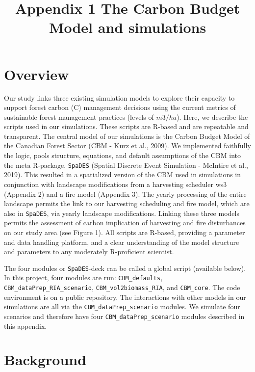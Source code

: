 \documentclass[
]{article}
\title{Appendix 1 The Carbon Budget Model and simulations}
\author{}
\date{\vspace{-2.5em}}
\begin{document}
\maketitle

\hypertarget{overview}{%
\section{Overview}\label{overview}}

Our study links three existing simulation models to explore their
capacity to support forest carbon (C) management decisions using the
current metrics of sustainable forest management practices (levels of
\(m3/ha\)). Here, we describe the scripts used in our simulations. These
scripts are R-based and are repeatable and transparent. The central
model of our simulations is the Carbon Budget Model of the Canadian
Forest Sector (CBM - Kurz et al., 2009). We implemented faithfully the
logic, pools structure, equations, and default assumptions of the CBM
into the meta R-package, \texttt{SpaDES} (Spatial Discrete Event
Simulation - McIntire et al., 2019). This resulted in a spatialized
version of the CBM used in simulations in conjunction with landscape
modifications from a harvesting scheduler ws3 (Appendix 2) and a fire
model (Appendix 3). The yearly processing of the entire landscape
permits the link to our harvesting scheduling and fire model, which are
also in \texttt{SpaDES}, via yearly landscape modifications. Linking
these three models permits the assessment of carbon implication of
harvesting and fire disturbances on our study area (see Figure 1). All
scripts are R-based, providing a parameter and data handling platform,
and a clear understanding of the model structure and parameters to any
moderately R-proficient scientist.

The four modules or \texttt{SpaDES}-deck can be called a global script
(available below). In this project, four modules are run:
\texttt{CBM\_defaults}, \texttt{CBM\_dataPrep\_RIA\_scenario},
\texttt{CBM\_vol2biomass\_RIA}, and \texttt{CBM\_core}. The code
environment is on a public repository. The interactions with other
models in our simulations are all via the
\texttt{CBM\_dataPrep\_scenario} modules. We simulate four scenarios and
therefore have four \texttt{CBM\_dataPrep\_scenario} modules described
in this appendix.

\hypertarget{background}{%
\section{Background}\label{background}}
\end{document}
